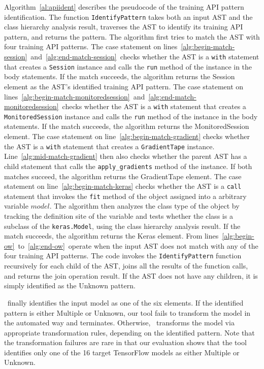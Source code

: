 Algorithm~\ref{al:apiident} describes the pseudocode of the training API
pattern identification.
The function {\tt IdentifyPattern} takes both an input AST and the class
hierarchy analysis result, traverses the AST to identify its training API
pattern, and returns the pattern.
The algorithm first tries to match the AST with four training API patterns.
The case statement on
lines~\ref{alg:begin-match-session}~and~\ref{alg:end-match-session}~checks
whether the AST is a {\tt with} statement that creates a {\tt Session} instance
and calls the {\tt run} method of the instance in the body statements.  If the
match succeeds, the algorithm returns the Session element as the AST's
identified training API pattern.
The case statement on
lines~\ref{alg:begin-match-monitoredsession}~and~\ref{alg:end-match-monitoredsession}~checks
whether the AST is a {\tt with} statement that creates a {\tt MonitoredSession}
instance and calls the {\tt run} method of the instance in the body statements.
If the match succeeds, the algorithm returns the MonitoredSession element.
The case statement on line~\ref{alg:begin-match-gradient} checks whether the
AST is a {\tt with} statement that creates a {\tt GradientTape} instance.
Line~\ref{alg:mid-match-gradient} then also checks whether the parent AST has a
child statement that calls the {\tt apply\_gradients} method of the instance.
If both matches succeed, the algorithm returns the GradientTape element.
The case statement on line~\ref{alg:begin-match-keras} checks whether the AST
is a {\tt call} statement that invokes the {\tt fit} method of the object
assigned into a arbitrary variable $model$.
The algorithm then analyzes the class type of the object by tracking the
definition site of the variable and tests whether the class is a subclass of
the {\tt keras.Model}, using the class hierarchy analysis result.
If the match succeeds, the algorithm returns the Keras element.
From lines~\ref{alg:begin-ow}~to~\ref{alg:end-ow}~operate when the input AST
does not match with any of the four training API patterns.
The code invokes the {\tt IdentifyPattern} function recursively for each child
of the AST, joins all the results of the function calls, and returns the join
operation result.
If the AST does not have any children, it is simply identified as the Unknown
pattern.


\tapi~finally identifies the input model as one of the six elements.
If the identified pattern is either Multiple or Unknown, our tool fails to
transform the model in the automated way and terminates. 
Otherwise, \atran~transforms the model via appropriate transformation rules,
depending on the identified pattern.
Note that the transformation failures are rare in that our evaluation shows
that the tool identifies only one of the 16 target TensorFlow models as either
Multiple or Unknown.


